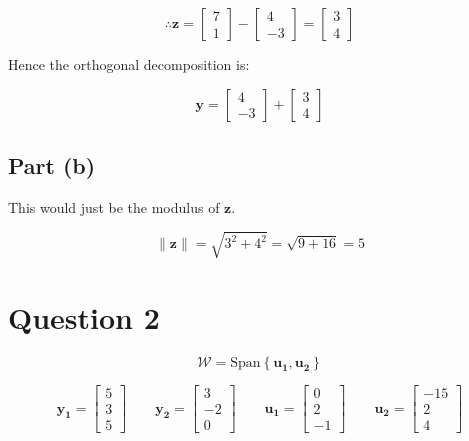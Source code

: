\documentclass{article}
\begin{document}
\[%
     \therefore 
     \mathbf{z}
     =
     \begin{bmatrix} 7\\1 \end{bmatrix}
     -
     \begin{bmatrix} 4\\-3 \end{bmatrix}
     =
     \begin{bmatrix} 3\\4 \end{bmatrix}
\]%

Hence the orthogonal decomposition is:

\[%
    \mathbf{y}=
    \begin{bmatrix} 4\\-3 \end{bmatrix}
    +
    \begin{bmatrix} 3\\4 \end{bmatrix}
\]%

\subsection{Part (b)} 
This would just be the modulus of $\mathbf{z}$.

\[%
    \|\mathbf{z}\|
    =
    \sqrt{3^{2}+4^{2}}
    =
    \sqrt{9+16}
    =
    5
\]%

\clearpage
\section{Question 2} 


\[%
    \mathcal{W} = \text{Span} \left\{ \mathbf{u_1}, \mathbf{u_2} \right\}
\]%


\[%
    \mathbf{y_1}
    =
    \begin{bmatrix} 5\\3\\5 \end{bmatrix}
    \qquad
    \mathbf{y_2}
    =
    \begin{bmatrix} 3\\-2\\ 0 \end{bmatrix}
    \qquad
    \mathbf{u_1}
    =
    \begin{bmatrix}0\\2\\-1\end{bmatrix}
    \qquad
    \mathbf{u_2}
    =
    \begin{bmatrix}-15\\2\\4\end{bmatrix}
\]%
\end{document}
